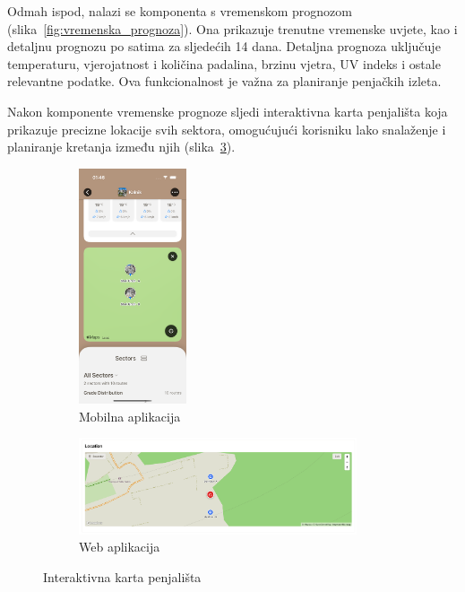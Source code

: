 Odmah ispod, nalazi se komponenta s vremenskom prognozom (slika~\ref{fig:vremenska_prognoza}). Ona prikazuje trenutne vremenske uvjete, kao i detaljnu prognozu po satima za sljedećih 14 dana. Detaljna prognoza uključuje temperaturu, vjerojatnost i količina padalina, brzinu vjetra, UV indeks i ostale relevantne podatke. Ova funkcionalnost je važna za planiranje penjačkih izleta.


Nakon komponente vremenske prognoze sljedi interaktivna karta penjališta koja prikazuje precizne lokacije svih sektora, omogućujući korisniku lako snalaženje i planiranje kretanja između njih (slika~\ref{fig:interaktivna_karta}). 

\begin{figure}[H]
    \centering
    \begin{subfigure}[b]{\textwidth}
        \centering
        \includegraphics[width=0.35\textwidth]{images/implementacija/crag-details/crag-map.png}
        \caption{Mobilna aplikacija}
        \label{fig:interaktivna_karta_mob}
    \end{subfigure}
    \hfill
    \begin{subfigure}[b]{\textwidth}
        \centering
        \includegraphics[width=0.9\textwidth]{images/implementacija/web/crag-details/crag-map.png}
        \caption{Web aplikacija}
        \label{fig:interaktivna_karta_web}
    \end{subfigure}
    \caption{Interaktivna karta penjališta}
    \label{fig:interaktivna_karta}
\end{figure}

